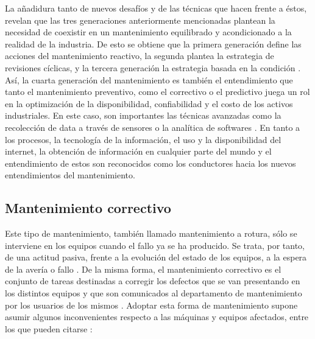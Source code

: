 La añadidura tanto de nuevos desafíos y de las técnicas que hacen frente a éstos, revelan que  las tres generaciones anteriormente mencionadas plantean la necesidad de coexistir en un mantenimiento equilibrado y acondicionado a la realidad de la industria. De esto se obtiene que la primera generación define las acciones del mantenimiento reactivo, la segunda plantea la estrategia de revisiones cíclicas, y la tercera generación la estrategia basada en la condición \citep{hide2013}.
Así, la cuarta generación del mantenimiento es también el entendimiento que tanto el mantenimiento preventivo, como el correctivo o el predictivo juega un rol en la optimización de la disponibilidad, confiabilidad y el costo de los activos industriales. En este caso, son importantes las técnicas avanzadas como la recolección de data a través de sensores o la analítica de softwares \citep{houle2016}.
En tanto a los procesos, la tecnología de la información, el uso y la disponibilidad del internet, la obtención de información en cualquier parte del mundo y el entendimiento de estos son reconocidos como los conductores hacia los nuevos entendimientos del mantenimiento.


\subsection{Mantenimiento correctivo}

Este tipo de mantenimiento, también llamado mantenimiento a rotura, sólo se interviene en los equipos cuando el fallo ya se ha producido. Se trata, por tanto, de una actitud pasiva, frente a la evolución del estado de los equipos, a la espera de la avería o fallo \citep{gomez1998}. De la misma forma, el mantenimiento correctivo es el conjunto de tareas destinadas a corregir los defectos que se van presentando en los distintos equipos y que son comunicados al departamento de mantenimiento por los usuarios de los mismos \citep{garcia2010}.
Adoptar esta forma de mantenimiento supone asumir algunos inconvenientes respecto a las máquinas y equipos afectados, entre los que pueden citarse \citep{gomez1998}:\\

